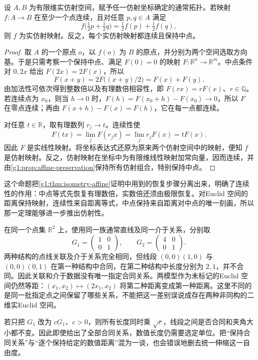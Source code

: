 \begin{proposition}\label{g1:prop:continuous-midpoint-affine}
	设 \(A,B\) 为有限维实仿射空间，赋予任一仿射坐标确定的通常拓扑。若映射 \(f:A\to B\) 在至少一个点连续，且对任意 \(p,q\in A\) 满足
	\[
		f\bigl(\tfrac12p+\tfrac12q\bigr)
		=\tfrac12 f(p)+\tfrac12 f(q),
	\]
	则 \(f\) 为实仿射映射。反之，每个实仿射映射都连续且保持中点。
\end{proposition}
\begin{proof}
	取 \(A\) 的一个原点 \(o\)，以 \(f(o)\) 为 \(B\) 的原点，并分别为两个空间选取方向基。于是只需考察一个保持中点、满足 \(F(0)=0\) 的映射 \(F:\mathbb R^n\to\mathbb R^m\)。中点条件对 \(0,2x\) 给出 \(F(2x)=2F(x)\)，所以
	\[
		F(x+y)=2F\bigl((x+y)/2\bigr)=F(x)+F(y).
	\]
	由加法性可依次得到整数倍以及有理数倍相容性，即 \(F(rx)=rF(x)\)、\(r\in\mathbb Q\)。若连续点为 \(x_0\)，则当 \(h\to0\) 时，\(F(h)=F(x_0+h)-F(x_0)\to0\)，所以 \(F\) 在零点连续；再由 \(F(x+h)-F(x)=F(h)\)，它在每一点都连续。

	对任意 \(t\in\mathbb R\)，取有理数列 \(r_j\to t\)。连续性使
	\[
		F(tx)=\lim_jF(r_jx)=\lim_jr_jF(x)=tF(x).
	\]
	因此 \(F\) 是实线性映射。将坐标表达式还原为原来两个仿射空间中的映射，便知 \(f\) 是仿射映射。反之，仿射映射在坐标中为有限维线性映射加常向量，因而连续，并由\cref{g1:prop:affine-preservation}保持所有仿射组合，特别保持中点。
\end{proof}

这个命题把\cref{g1:thm:isometry-affine}证明中用到的恢复步骤分离出来，明确了连续性的作用：中点等式先恢复有理数倍，实数倍还须由极限恢复。对Euclid 空间的距离保持映射，连续性来自距离等式，中点保持来自距离对中点的唯一刻画，所以那一定理能够进一步推出仿射性。

\begin{example}\label{g1:exm:incidence-order-not-congruence}
	在同一个点集 \(\mathbb R^2\) 上，使用同一族通常直线及同一介于关系，分别取
	\[
		G_1=\begin{pmatrix}1&0\\0&1\end{pmatrix},
		\qquad G_2=\begin{pmatrix}4&0\\0&1\end{pmatrix}.
	\]
	两种结构的点线关联及介于关系完全相同，但线段 \((0,0)(1,0)\) 与 \((0,0)(0,1)\) 在第一种结构中合同，在第二种结构中长度分别为 \(2,1\)，并不合同。因此关联和介于数据没有唯一指定合同关系。两模型作为未标记的Euclid 空间仍然等距：\((x_1,x_2)\mapsto(2x_1,x_2)\) 将第二种距离变成第一种距离。这里不同的是同一批指定点之间保留了哪些关系，不能把这一差别误说成存在两种非同构的二维实Euclid 空间。

	若只把 \(G_1\) 改为 \(cG_1\)、\(c>0\)，则所有长度同时乘 \(\sqrt c\)，线段之间是否合同和夹角大小都不变。因此即使给出了全部合同关系，数值长度仍需要选定单位。把“保持合同关系”与“逐个保持给定的数值距离”混为一谈，也会错误地删去统一伸缩这一自由度。
\end{example}

